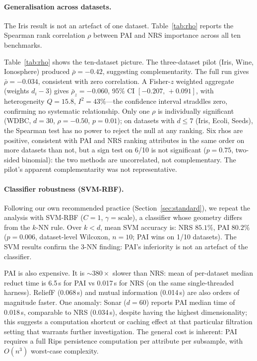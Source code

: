 \paragraph{Generalisation across datasets.}
The Iris result is not an artefact of one dataset.
Table~\ref{tab:rho} reports the Spearman rank correlation $\rho$ between PAI
and NRS importance across all ten benchmarks.



Table~\ref{tab:rho} shows the ten-dataset picture.
The three-dataset pilot (Iris, Wine, Ionosphere) produced $\bar\rho=-0.42$,
suggesting complementarity.  The full run gives $\bar\rho = -0.034$, consistent
with zero correlation.  A Fisher-$z$ weighted aggregate (weights $d_i - 3$)
gives $\bar\rho_z = -0.060$, 95\% CI $[-0.207,\,+0.091]$, with
heterogeneity $Q = 15.8$, $I^2 = 43\%$---the confidence interval straddles
zero, confirming no systematic relationship.
Only one $\rho$ is individually significant
(WDBC, $d=30$, $\rho=-0.50$, $p=0.01$); on datasets with $d \leq 7$
(Iris, Ecoli, Seeds), the Spearman test has no power to reject the null
at any ranking.  Six rhos are positive, consistent with PAI and NRS ranking
attributes in the same order on more datasets than not, but a sign test on
6/10 is not significant ($p = 0.75$, two-sided binomial): the two methods are
uncorrelated, not complementary.  The pilot's apparent complementarity was not representative.

\paragraph{Classifier robustness (SVM-RBF).}
Following our own recommended practice (Section~\ref{sec:standard}), we
repeat the analysis with SVM-RBF ($C=1$, $\gamma=\text{scale}$), a
classifier whose geometry differs from the $k$-NN rule.  Over $k < d$,
mean SVM accuracy is: NRS $85.1\%$, PAI $80.2\%$ ($p = 0.006$, dataset-level
Wilcoxon, $n=10$; PAI wins on 1/10 datasets).  The SVM results confirm
the 3-NN finding: PAI's inferiority is not an artefact of the classifier.

PAI is also expensive.  It is $\sim 380\times$ slower than NRS: mean of per-dataset median reduct time
is 6.5\,s for PAI vs 0.017\,s for NRS (on the same single-threaded harness).
ReliefF (0.068\,s) and mutual information (0.014\,s) are also orders of
magnitude faster.  One anomaly: Sonar ($d=60$) reports PAI median time of
0.018\,s, comparable to NRS (0.034\,s), despite having the highest
dimensionality; this suggests a computation shortcut or caching effect at
that particular filtration setting that warrants further investigation.
The general cost is inherent: PAI requires a full Rips
persistence computation per attribute per subsample, with $O(n^3)$ worst-case
complexity.

